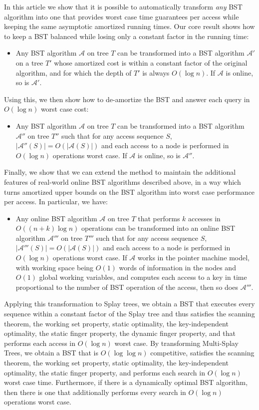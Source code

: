 \documentclass[11pt]{article}
\def\A{{\mathcal{A}}}
\begin{document}
In this article we show that it is possible to automatically transform \emph{any}
BST algorithm into one that provides worst case time guarantees per access
while keeping the same asymptotic amortized running times. Our core result
shows how to keep a BST balanced while losing only a constant factor in the
running time:
\begin{itemize}
\item Any BST algorithm $\A$ on tree $T$ can be transformed into a BST
algorithm $\A'$ on a tree $T'$ whose amortized cost is within a constant
factor of the original algorithm, and for which the depth of $T'$ is always
$O(\log n)$. If $\A$ is online, so is $\A'$.
\end{itemize}
Using this, we then show how to de-amortize the BST and answer each query
in $O(\log n)$ worst case cost:
\begin{itemize}
\item Any BST algorithm $\A$ on tree $T$ can be transformed into a BST
algorithm $\A''$ on tree $T''$ such that for any access sequence $S$,
$|\A''(S)| = O(|\A(S)|)$ and each access to a node is performed in $O(\log
n)$ operations worst case. If $\A$ is online, so is $\A''$.
\end{itemize}

Finally, we show that we can extend the method to maintain the additional
features of real-world online BST algorithms described above, in a way
which turns amortized upper bounds on the BST algorithm into worst case
performance per access. In particular, we have:

\begin{itemize}
\item Any online BST algorithm $\A$ on tree $T$ that performs $k$ accesses
in $O((n+k)\log n)$ operations can be transformed into an online BST
algorithm $\A'''$ on tree $T'''$ such that for any access sequence $S$,
$|\A'''(S)| = O(|\A(S)|)$ and each access to a node is performed in $O(\log
n)$ operations worst case.
If $\A$ works in the pointer machine model, with working space being $O(1)$
words of information in the nodes and $O(1)$ global working variables, and
computes each access to a key in time proportional to the number of BST
operation of the access, then so does $\A'''$.

\end{itemize}

Applying this transformation to Splay trees, we obtain a BST that
executes every sequence within a constant factor of the Splay tree and
thus satisfies the scanning theorem, the working set property, static
optimality, the key-independent optimality, the static finger
property, the dynamic finger property, and that performs each access
in $O(\log n)$ worst case. 
By transforming Multi-Splay Trees, we obtain a BST that
is $O(\log \log n)$ competitive, satisfies the scanning theorem, the
working set property, static optimality, the key-independent
optimality, the static finger property, and
performs each search in $O(\log n)$ worst case time. 
Furthermore, if there is a dynamically optimal BST algorithm, then
there is one that additionally performs every search in $O(\log n)$
operations worst case.
\end{document}
